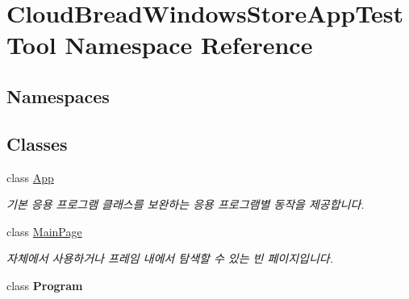 \hypertarget{a00437}{}\section{Cloud\+Bread\+Windows\+Store\+App\+Test\+Tool Namespace Reference}
\label{a00437}
\subsection*{Namespaces}
\begin{DoxyCompactItemize}
\end{DoxyCompactItemize}
\subsection*{Classes}
\begin{DoxyCompactItemize}
\item 
class \hyperlink{a00015}{App}
\begin{DoxyCompactList}\small\item\em 기본 응용 프로그램 클래스를 보완하는 응용 프로그램별 동작을 제공합니다. \end{DoxyCompactList}\item 
class \hyperlink{a00132}{Main\+Page}
\begin{DoxyCompactList}\small\item\em 자체에서 사용하거나 프레임 내에서 탐색할 수 있는 빈 페이지입니다. \end{DoxyCompactList}\item 
class {\bfseries Program}
\end{DoxyCompactItemize}
